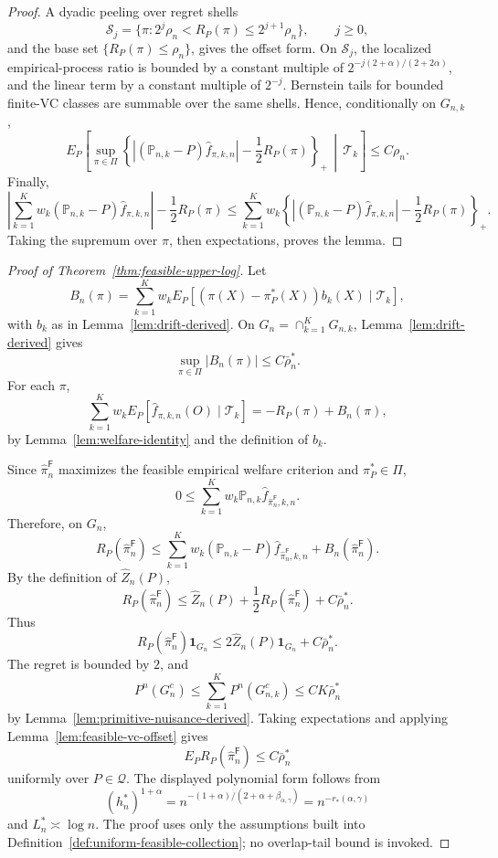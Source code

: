 \documentclass[11pt]{article}
\newcommand{\one}{\mathbf{1}}
\theoremstyle{definition}
\theoremstyle{plain}
\theoremstyle{remark}
\begin{document}
\begin{proof}
A dyadic peeling over regret shells
\[
\mathcal S_j=\{\pi:2^j\rho_n<R_P(\pi)\le2^{j+1}\rho_n\},\qquad j\ge0,
\]
and the base set \(\{R_P(\pi)\le\rho_n\}\), gives the offset form.  On
\(\mathcal S_j\), the localized empirical-process ratio is bounded by a
constant multiple of \(2^{-j(2+\alpha)/(2+2\alpha)}\), and the linear term by
a constant multiple of \(2^{-j}\).  Bernstein tails for bounded finite-VC
classes are summable over the same shells.  Hence, conditionally on
\(G_{n,k}\),
\[
E_P\!\left[
\sup_{\pi\in\Pi}
\left\{|(\mathbb P_{n,k}-P)\widehat f_{\pi,k,n}|
-\frac12R_P(\pi)\right\}_+
\,\middle|\,\mathcal T_k\right]
\le C\rho_n.
\]
Finally,
\[
\left|\sum_{k=1}^K w_k
(\mathbb P_{n,k}-P)\widehat f_{\pi,k,n}\right|
-\frac12R_P(\pi)
\le
\sum_{k=1}^K w_k
\left\{|(\mathbb P_{n,k}-P)\widehat f_{\pi,k,n}|
-\frac12R_P(\pi)\right\}_+.
\]
Taking the supremum over \(\pi\), then expectations, proves the lemma.
\end{proof}

\begin{proof}[Proof of Theorem~\ref{thm:feasible-upper-log}]
Let
\[
B_n(\pi)=
\sum_{k=1}^K w_k
E_P[(\pi(X)-\pi_P^*(X))b_k(X)\mid\mathcal T_k],
\]
with \(b_k\) as in Lemma~\ref{lem:drift-derived}.  On
\(G_n=\cap_{k=1}^K G_{n,k}\), Lemma~\ref{lem:drift-derived} gives
\[
\sup_{\pi\in\Pi}|B_n(\pi)|\le C\bar\rho_n^*.
\]
For each \(\pi\),
\[
\sum_{k=1}^K w_k
E_P[\widehat f_{\pi,k,n}(O)\mid\mathcal T_k]
=
-R_P(\pi)+B_n(\pi),
\]
by Lemma~\ref{lem:welfare-identity} and the definition of \(b_k\).

Since \(\widehat\pi_n^{\mathsf F}\) maximizes the feasible empirical welfare
criterion and \(\pi_P^*\in\Pi\),
\[
0\le
\sum_{k=1}^K w_k\mathbb P_{n,k}
\widehat f_{\widehat\pi_n^{\mathsf F},k,n}.
\]
Therefore, on \(G_n\),
\[
R_P(\widehat\pi_n^{\mathsf F})
\le
\sum_{k=1}^K w_k
(\mathbb P_{n,k}-P)\widehat f_{\widehat\pi_n^{\mathsf F},k,n}
+B_n(\widehat\pi_n^{\mathsf F}).
\]
By the definition of \(\widehat Z_n(P)\),
\[
R_P(\widehat\pi_n^{\mathsf F})
\le
\widehat Z_n(P)
+\frac12R_P(\widehat\pi_n^{\mathsf F})
+C\bar\rho_n^*.
\]
Thus
\[
R_P(\widehat\pi_n^{\mathsf F})\one_{G_n}
\le
2\widehat Z_n(P)\one_{G_n}+C\bar\rho_n^*.
\]
The regret is bounded by \(2\), and
\[
P^n(G_n^c)\le\sum_{k=1}^K P^n(G_{n,k}^c)
\le CK\bar\rho_n^*
\]
by Lemma~\ref{lem:primitive-nuisance-derived}.  Taking expectations and
applying Lemma~\ref{lem:feasible-vc-offset} gives
\[
E_P R_P(\widehat\pi_n^{\mathsf F})
\le C\bar\rho_n^*
\]
uniformly over \(P\in\mathcal Q\).  The displayed polynomial form follows
from
\[
(h_n^*)^{1+\alpha}=n^{-(1+\alpha)/(2+\alpha+\beta_{\alpha,\gamma})}
=n^{-r_*(\alpha,\gamma)}
\]
and \(L_n^*\asymp\log n\).  The proof uses only the assumptions built into
Definition~\ref{def:uniform-feasible-collection}; no overlap-tail bound is
invoked.
\end{proof}
\end{document}

